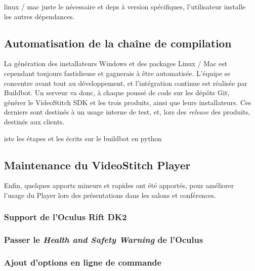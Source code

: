 linux / mac juste le nécessaire et deps à version spécifiques, l'utilisateur
installe les autres dépendances.

\subsection{Automatisation de la chaîne de compilation}
La génération des installateurs Windows et des packages Linux / Mac est cependant
toujours fastidieuse et gagnerais à être automatisée. L'équipe se concentre avant
tout au développement, et l'intégration continue est réalisée par Buildbot. Un
serveur va donc, à chaque poussé de code sur les dépôts Git, générer le VideoStitch
SDK et les trois produits, ainsi que leurs installateurs. Ces derniers sont destinés
à un usage interne de test, et, lors des \textit{release} des produits, destinés
aux clients.


iste les étapes et les écrits sur le buildbot en python 

\subsection{Maintenance du VideoStitch Player}
Enfin, quelques apports mineurs et rapides ont été apportés, pour améliorer l'usage
du Player lors des présentations dans les salons et conférences.
\subsubsection{Support de l'Oculus Rift DK2}

\subsubsection{Passer le \textit{Health and Safety Warning} de l'Oculus}

\subsubsection{Ajout d'options en ligne de commande}
